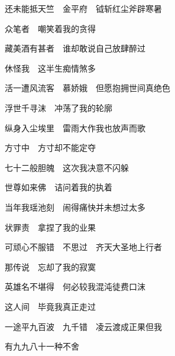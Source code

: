 {还未能抵天竺　金平府　钺斩红尘斧辟寒暑

众笔者　嘲笑着我的贪得

藏美酒有甚者　谁却敢说自己放肆醉过

休怪我　这半生痴情煞多

活一遭风流客　慕娇娥　但愿抱拥世间真绝色

\bigskip

浮世千寻沫　冲荡了我的轮廓

纵身入尘埃里　雷雨大作我也放声而歌

方寸中　方寸却不能定夺

七十二般胆魄　这次我决意不闪躲

世尊如来佛　诘问着我的执着

当年我瑶池刻　闹得痛快并未想过太多

状罪责　拿捏了我的业果

可顽心不服错　不思过　齐天大圣地上行者 

那传说　忘却了我的寂寞

英雄名不堪得　何必较我混沌徒费口沫

这人间　毕竟我真正走过

一途平九百波　九千错　凌云渡成正果但我

有九九八十一种不舍

}
